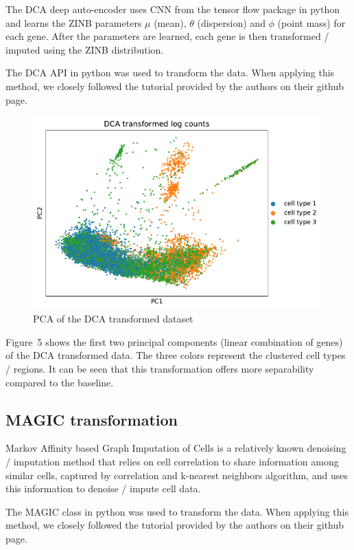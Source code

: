 The DCA deep auto-encoder uses CNN from the tensor flow package in python and learns the ZINB parameters $\mu$ (mean), $\theta$ (dispersion) and $\phi$ (point mass) \citep{eraslan2018single} for each gene. After the parameters are learned, each gene is then transformed / imputed using the ZINB distribution.

The DCA API in python was used to transform the data. When applying this method, we closely followed the tutorial provided by the authors on their github page.

\begin{figure}
\includegraphics[width=\linewidth]{pca_dca_log_counts.pdf}
\caption{PCA of the DCA transformed dataset}
\end{figure}

Figure~5 shows the first two principal components (linear combination of genes) of the DCA transformed data. The three colors represent the clustered cell types / regions. It can be seen that this transformation offers more separability compared to the baseline.

\subsection*{MAGIC transformation}

Markov Affinity based Graph Imputation of Cells \citep{van2018recovering} is a relatively known denoising / imputation method that relies on cell correlation to share information among similar cells, captured by correlation and k-nearest neighbors algorithm, and uses this information to denoise / impute cell data.

The MAGIC class in python was used to transform the data. When applying this method, we closely followed the tutorial provided by the authors on their github page.

